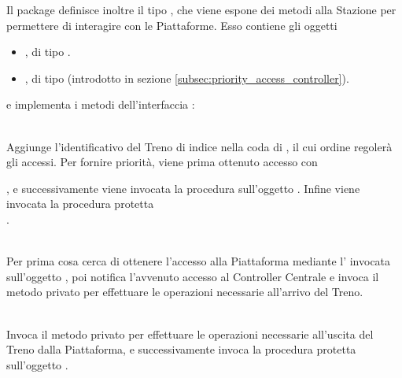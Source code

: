 	Il package  definisce inoltre il tipo  , che viene espone dei metodi alla Stazione per permettere di interagire con le Piattaforme. Esso contiene gli oggetti
		\begin{itemize}
			\item {}, di tipo .
			\item {}, di tipo  (introdotto in sezione \ref{subsec:priority_access_controller}).
		\end{itemize} 
	e implementa i metodi dell'interfaccia :
	\begin{description}
		
		\item {} \\
			Aggiunge l'identificativo del Treno di indice  nella coda  di , il cui ordine regolerà gli accessi. Per fornire priorità, viene prima ottenuto accesso con 
			\begin{center}
			\end{center}, e successivamente viene invocata la procedura  sull'oggetto . Infine viene invocata la procedura protetta \\.
		
		\item {}\\
		Per prima cosa cerca di ottenere l'accesso alla Piattaforma mediante l'  invocata sull'oggetto , poi notifica l'avvenuto accesso al Controller Centrale e invoca il metodo privato  per effettuare le operazioni necessarie all'arrivo del Treno.
		
		\item {}\\
		Invoca il metodo privato  per effettuare le operazioni necessarie all'uscita del Treno dalla Piattaforma, e successivamente invoca la procedura protetta  sull'oggetto .
		

\end{description}
